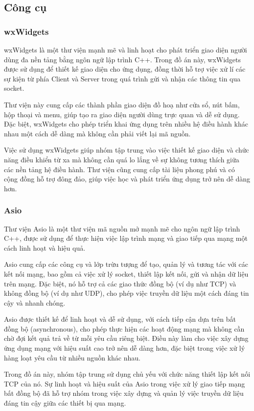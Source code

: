 \subsection{Công cụ}
\subsubsection{wxWidgets}
wxWidgets là một thư viện mạnh mẽ và linh hoạt cho phát triển giao diện người dùng đa nền tảng bằng ngôn ngữ lập trình C++. Trong đồ án này, wxWidgets được sử dụng để thiết kế giao diện cho ứng dụng, đồng thời hỗ trợ việc xử lí các sự kiện từ phía Client và Server trong quá trình gửi và nhận các thông tin qua socket.

Thư viện này cung cấp các thành phần giao diện đồ hoạ như cửa sổ, nút bấm, hộp thoại và menu, giúp tạo ra giao diện người dùng trực quan và dễ sử dụng. Đặc biệt, wxWidgets cho phép triển khai ứng dụng trên nhiều hệ điều hành khác nhau một cách dễ dàng mà không cần phải viết lại mã nguồn.

Việc sử dụng wxWidgets giúp nhóm tập trung vào việc thiết kế giao diện và chức năng điều khiển từ xa mà không cần quá lo lắng về sự không tương thích giữa các nền tảng hệ điều hành. Thư viện cũng cung cấp tài liệu phong phú và có cộng đồng hỗ trợ đông đảo, giúp việc học và phát triển ứng dụng trở nên dễ dàng hơn.
\subsubsection{Asio}

Thư viện Asio là một thư viện mã nguồn mở mạnh mẽ cho ngôn ngữ lập trình C++, được sử dụng để thực hiện việc lập trình mạng và giao tiếp qua mạng một cách linh hoạt và hiệu quả.

Asio cung cấp các công cụ và lớp trừu tượng để tạo, quản lý và tương tác với các kết nối mạng, bao gồm cả việc xử lý socket, thiết lập kết nối, gửi và nhận dữ liệu trên mạng. Đặc biệt, nó hỗ trợ cả các giao thức đồng bộ (ví dụ như TCP) và không đồng bộ (ví dụ như UDP), cho phép việc truyền dữ liệu một cách đáng tin cậy và nhanh chóng.

Asio được thiết kế để linh hoạt và dễ sử dụng, với cách tiếp cận dựa trên bất đồng bộ (asynchronous), cho phép thực hiện các hoạt động mạng mà không cần chờ đợi kết quả trả về từ mỗi yêu cầu riêng biệt. Điều này làm cho việc xây dựng ứng dụng mạng với hiệu suất cao trở nên dễ dàng hơn, đặc biệt trong việc xử lý hàng loạt yêu cầu từ nhiều nguồn khác nhau.

Trong đồ án này, nhóm tập trung sử dụng chủ yếu với chức năng thiết lập kết nối TCP của nó. Sự linh hoạt và hiệu suất của Asio trong việc xử lý giao tiếp mạng bất đồng bộ đã hỗ trợ nhóm trong việc xây dựng và quản lý việc truyền dữ liệu đáng tin cậy giữa các thiết bị qua mạng.
